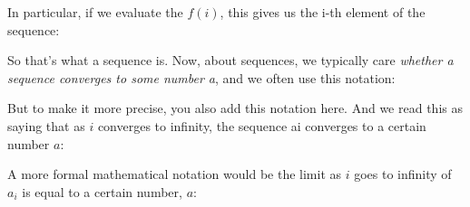 \documentclass[pdftex, brazil, 12pt, twoside]{article}
\begin{document}
In
particular, if we evaluate the $f(i)$,
this gives us the i-th element of the sequence:

\begin{figure}[H]
  \begin{center}
  \end{center}
\end{figure}

So that's what a sequence is.
Now, about sequences, we typically care \emph{whether a
sequence converges to some number a}, and we often use
this notation:

\begin{figure}[H]
  \begin{center}
  \end{center}
\end{figure}

But to make it more precise, you also add
this notation here.
And we read this as saying that as $i$ converges to
infinity, the sequence ai converges to a
certain number $a$:

\begin{figure}[H]
  \begin{center}
  \end{center}
\end{figure}

A more formal mathematical notation would be the limit as
$i$ goes to infinity of $a_i$ is equal to a certain number, $a$:

\begin{figure}[H]
  \begin{center}
  \end{center}
\end{figure}
\end{document}
